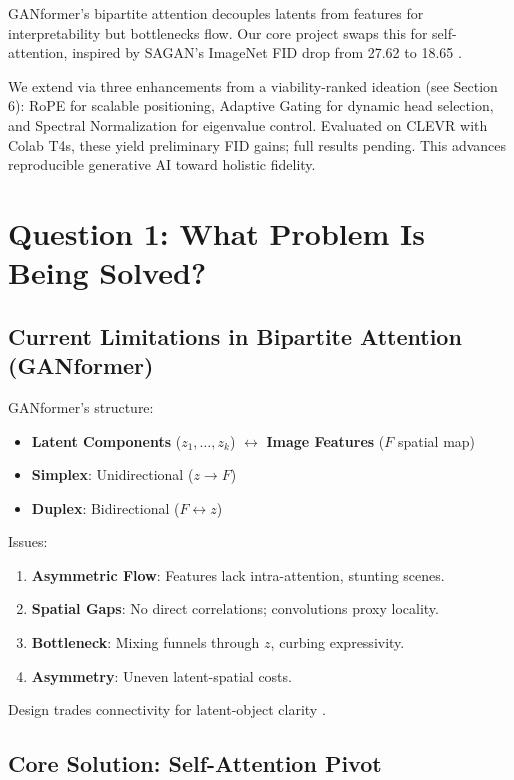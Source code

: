 \documentclass[12pt,a4paper]{article}
\begin{document}
GANformer's bipartite attention decouples latents from features for interpretability but bottlenecks flow. Our core project swaps this for self-attention, inspired by SAGAN's ImageNet FID drop from 27.62 to 18.65 \citep{zhang2019self}. 

We extend via three enhancements from a viability-ranked ideation (see Section 6): RoPE for scalable positioning, Adaptive Gating for dynamic head selection, and Spectral Normalization for eigenvalue control. Evaluated on CLEVR with Colab T4s, these yield preliminary FID gains; full results pending. This advances reproducible generative AI toward holistic fidelity.

\section{Question 1: What Problem Is Being Solved?}

\subsection{Current Limitations in Bipartite Attention (GANformer)}

GANformer's structure:

\begin{itemize}
    \item \textbf{Latent Components} ($z_1, \dots, z_k$) $\leftrightarrow$ \textbf{Image Features} ($F$ spatial map)
    \item \textbf{Simplex}: Unidirectional ($z \to F$)
    \item \textbf{Duplex}: Bidirectional ($F \leftrightarrow z$)
\end{itemize}

Issues:
\begin{enumerate}
    \item \textbf{Asymmetric Flow}: Features lack intra-attention, stunting scenes.
    \item \textbf{Spatial Gaps}: No direct correlations; convolutions proxy locality.
    \item \textbf{Bottleneck}: Mixing funnels through $z$, curbing expressivity.
    \item \textbf{Asymmetry}: Uneven latent-spatial costs.
\end{enumerate}

Design trades connectivity for latent-object clarity \citep{hudson2021}.

\subsection{Core Solution: Self-Attention Pivot}
\end{document}
